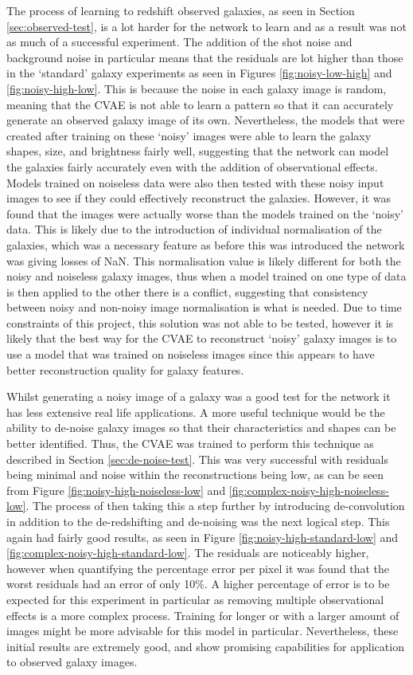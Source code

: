 \documentclass[fleqn,usenatbib]{mnras}
\begin{document}
The process of learning to redshift observed galaxies, as seen in Section \ref{sec:observed-test}, is a lot harder for the network to learn and as a result was not as much of a successful experiment. The addition of the shot noise and background noise in particular means that the residuals are lot higher than those in the ‘standard' galaxy experiments as seen in Figures \ref{fig:noisy-low-high} and \ref{fig:noisy-high-low}. This is because the noise in each galaxy image is random, meaning that the CVAE is not able to learn a pattern so that it can accurately generate an observed galaxy image of its own. Nevertheless, the models that were created after training on these `noisy' images were able to learn the galaxy shapes, size, and brightness fairly well, suggesting that the network can model the galaxies fairly accurately even with the addition of observational effects. Models trained on noiseless data were also then tested with these noisy input images to see if they could effectively reconstruct the galaxies. However, it was found that the images were actually worse than the models trained on the `noisy' data. This is likely due to the introduction of individual normalisation of the galaxies, which was a necessary feature as before this was introduced the network was giving losses of NaN. This normalisation value is likely different for both the noisy and noiseless galaxy images, thus when a model trained on one type of data is then applied to the other there is a conflict, suggesting that consistency between noisy and non-noisy image normalisation is what is needed. Due to time constraints of this project, this solution was not able to be tested, however it is likely that the best way for the CVAE to reconstruct `noisy' galaxy images is to use a model that was trained on noiseless images since this appears to have better reconstruction quality for galaxy features.

Whilst generating a noisy image of a galaxy was a good test for the network it has less extensive real life applications. A more useful technique would be the ability to de-noise galaxy images so that their characteristics and shapes can be better identified. Thus, the CVAE was trained to perform this technique as described in Section \ref{sec:de-noise-test}. This was very successful with residuals being minimal and noise within the reconstructions being low, as can be seen from Figure \ref{fig:noisy-high-noiseless-low} and \ref{fig:complex-noisy-high-noiseless-low}. The process of then taking this a step further by introducing de-convolution in addition to the de-redshifting and de-noising was the next logical step. This again had fairly good results, as seen in Figure \ref{fig:noisy-high-standard-low} and \ref{fig:complex-noisy-high-standard-low}. The residuals are noticeably higher, however when quantifying the percentage error per pixel it was found that the worst residuals had an error of only 10\%. A higher percentage of error is to be expected for this experiment in particular as removing multiple observational effects is a more complex process. Training for longer or with a larger amount of images might be more advisable for this model in particular. Nevertheless, these initial results are extremely good, and show promising capabilities for application to observed galaxy images.
\end{document}
